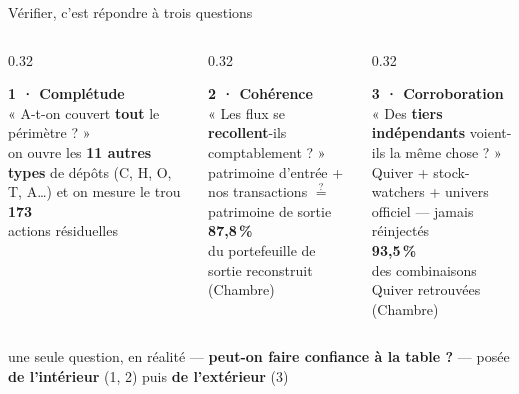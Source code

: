 \documentclass[11pt,aspectratio=169]{beamer}
\begin{document}
\begin{frame}{Vérifier, c'est répondre à trois questions}
  \centering
  \vspace{2mm}
  \begin{columns}[T]
    \begin{column}{0.32\textwidth}\centering
      \colorbox{helec!10}{\parbox[t][47mm][t]{\dimexpr\linewidth-8pt}{\vspace{1.5mm}\centering
        {\color{helec}\large\textbf{1 · Complétude}}\\[2mm]
        {\footnotesize « A-t-on couvert \textbf{tout} le périmètre ? »}\\[3mm]
        {\scriptsize on ouvre les \textbf{11 autres types} de dépôts
         (C, H, O, T, A…) et on mesure le trou}\\[2.5mm]
        {\color{helec}\Large\textbf{173}}\\[0.5mm]{\tiny actions résiduelles}}}
    \end{column}
    \begin{column}{0.32\textwidth}\centering
      \colorbox{okgreen!10}{\parbox[t][47mm][t]{\dimexpr\linewidth-8pt}{\vspace{1.5mm}\centering
        {\color{okgreen}\large\textbf{2 · Cohérence}}\\[2mm]
        {\footnotesize « Les flux se \textbf{recollent}-ils comptablement ? »}\\[3mm]
        {\scriptsize patrimoine d'entrée + nos transactions
         $\overset{?}{=}$ patrimoine de sortie}\\[2.5mm]
        {\color{okgreen}\Large\textbf{87,8\,\%}}\\[0.5mm]{\tiny du portefeuille de sortie reconstruit (Chambre)}}}
    \end{column}
    \begin{column}{0.32\textwidth}\centering
      \colorbox{dataC!10}{\parbox[t][47mm][t]{\dimexpr\linewidth-8pt}{\vspace{1.5mm}\centering
        {\color{dataC}\large\textbf{3 · Corroboration}}\\[2mm]
        {\footnotesize « Des \textbf{tiers indépendants} voient-ils la même chose ? »}\\[3mm]
        {\scriptsize Quiver + stock-watchers + univers officiel —
         jamais réinjectés}\\[2.5mm]
        {\color{dataC}\Large\textbf{93,5\,\%}}\\[0.5mm]{\tiny des combinaisons Quiver retrouvées (Chambre)}}}
    \end{column}
  \end{columns}
  \vspace{4mm}
  {\footnotesize une seule question, en réalité — \textbf{peut-on faire confiance à la table ?} —
   posée \textbf{de l'intérieur} (1, 2) puis \textbf{de l'extérieur} (3)}
\end{frame}
\end{document}
